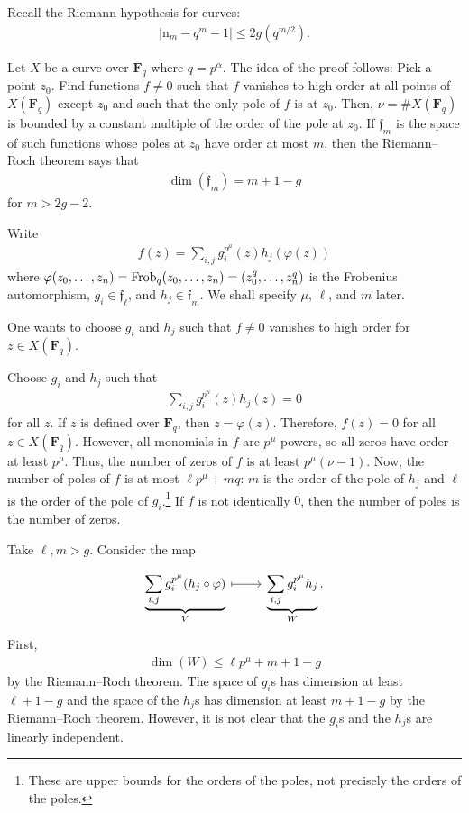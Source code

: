 \documentclass [11 pt, oneside] {article}
\begin{document}
Recall the Riemann hypothesis for curves:
\begin{align*}
	\left\lvert \mathup{n}_{m}-q^{m}-1 \right\rvert \le 2g(q^{m/2}).
\end{align*}

Let $X$ be a curve over $\mathbf{F}_{q}$ where $q = p^{\alpha}$. The idea of the proof follows: 
Pick a point $z_0$. 
Find functions $f\ne 0$ such that $f$ vanishes to high order at all points of $X(\mathbf{F}_{q})$ except $z_0$ and such that the only pole of $f$ is at $z_0$. Then, $\nu = \# X(\mathbf{F}_{q})$ is bounded by a constant multiple of the order of the pole at $z_0$.
If $\mathfrak{f}_{m}$ is the space of such functions whose poles at $z_0$ have order at most $m$, then the Riemann--Roch theorem says that  
\begin{align*}
	\dim (\mathfrak{f}_{m}) = m+1-g
\end{align*}
for $m>2g-2$.

Write
\begin{align*}
	f(z) = \sum_{i,j}^{} g_{i}^{p^\mu}(z) h _{j}(\varphi(z))
\end{align*}
where $\varphi(z_0,\hdots,z_{n}) = \operatorname{Frob} _{q}(z_0,\hdots,z_{n}) = (z_0^{q},\hdots,z_{n}^{q})$ is the Frobenius automorphism, $g_{i}\in \mathfrak{f}_{\ell}$, and $h_{j}\in \mathfrak{f}_{m}$.
We shall specify $\mu$, $\ell$, and $m$ later.

One wants to choose $g_{i}$ and $h_{j}$ such that $f\ne 0$ vanishes to high order for $z\in X(\mathbf{F}_{q})$. 

Choose $g_{i}$ and $h_{j}$ such that
\begin{align*}
	\sum_{i,j}^{} g_{i}^{p^\mu}(z) h_{j}(z)=0
\end{align*}
for all $z$. If $z$ is defined over $\mathbf{F}_{q}$, then $z=\varphi(z)$. Therefore, $f(z)=0$ for all $z\in X(\mathbf{F}_{q})$.
However, all monomials in $f$ are $p^{\mu}$ powers, so all zeros have order at least $p^{\mu}$.
Thus, the number of zeros of $f$ is at least $p^{\mu}(\nu - 1)$.
Now, the number of poles of $f$ is at most $\ell p^{\mu}+mq$: $m$ is the order of the pole of $h_{j}$ and $\ell$ is the order of the pole of $g_{i}$.\footnote{These are upper bounds for the orders of the poles, not precisely the orders of the poles.} If $f$ is not identically $0$, then the number of poles is the number of zeros.

Take $\ell,m>g$. Consider the map 
\[
\begin{tikzcd}
	\displaystyle\underbrace{\sum_{i,j}^{} g_{i}^{p^{\mu}} (h_{j}\circ \varphi)}_{V} \ar[r,mapsto] & \displaystyle\underbrace{\sum_{i,j}^{} g_{i}^{p^{\mu}} h_{j}}_{W}.
\end{tikzcd}
\]
First,
\begin{align*}
	\dim(W)\le \ell p ^{\mu} + m+1-g
\end{align*}
by the Riemann--Roch theorem. 
The space of $g_{i}$s has dimension at least $\ell+1-g$ and the space of the $h_{j}$s has dimension at least $m + 1 -g$ by the Riemann--Roch theorem. However, it is not clear that the $g_{i}$s and the $h_j$s are linearly independent.
\end{document}
